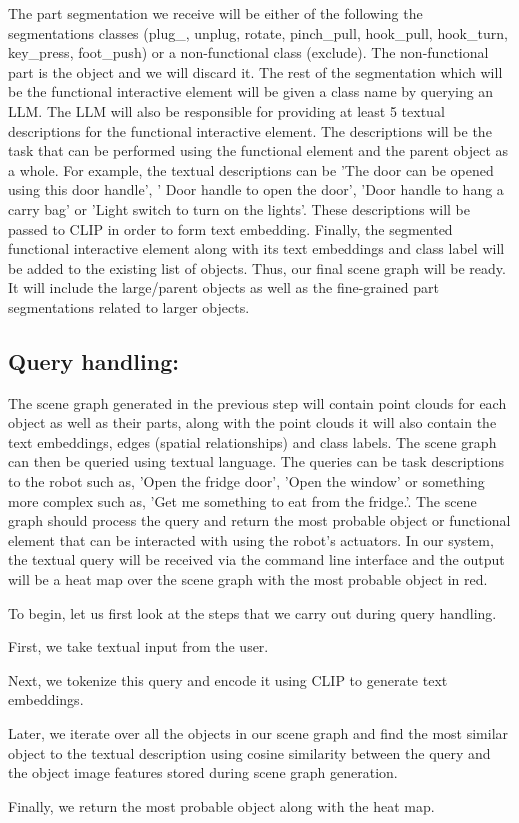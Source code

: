 The part segmentation we receive will be either of the following the segmentations classes (plug\_, unplug, rotate, pinch\_pull, hook\_pull, 
hook\_turn, key\_press, foot\_push) or a non-functional class (exclude). The non-functional part is the object and we will discard it. The rest of the 
segmentation which will be the functional interactive element will be given a class name by querying an LLM. The LLM will also be responsible for providing
at least 5 textual descriptions for the functional interactive element. The descriptions will be the task that can be performed using the 
functional element and the parent object as a whole. For example, the textual descriptions can be 'The door can be opened using this door handle', '
Door handle to open the door', 'Door handle to hang a carry bag' or 'Light switch to turn on the lights'. These descriptions will be passed to CLIP
in order to form text embedding. Finally, the segmented functional interactive element along with its text embeddings and class label will be added
to the existing list of objects. Thus, our final scene graph will be ready. It will include the large/parent objects as well as the fine-grained
part segmentations related to larger objects. 

\subsection{Query handling:}
The scene graph generated in the previous step will contain point clouds for each object as well as their parts, along with the point clouds it will
also contain the text embeddings, edges (spatial relationships) and class labels. The scene graph can then be queried using textual language. The queries
can be task descriptions to the robot such as, 'Open the fridge door', 'Open the window' or something more complex such as, 'Get me something to eat 
from the fridge.'. The scene graph should process the query and return the most probable object or functional element that can be interacted with using the
robot's actuators. In our system, the textual query will be received via the command line interface and the output will be a heat map over the scene graph
with the most probable object in red. 

To begin, let us first look at the steps that we carry out during query handling. 
\begin{compactenum}[1.]
\item First, we take textual input from the user. 
\item Next, we tokenize this query and encode it using CLIP to generate text embeddings.
\item Later, we iterate over all the objects in our scene graph and find the most similar object to the textual description using cosine similarity between the query and the object image features stored during scene graph generation.
\item Finally, we return the most probable object along with the heat map.
\end{compactenum}

